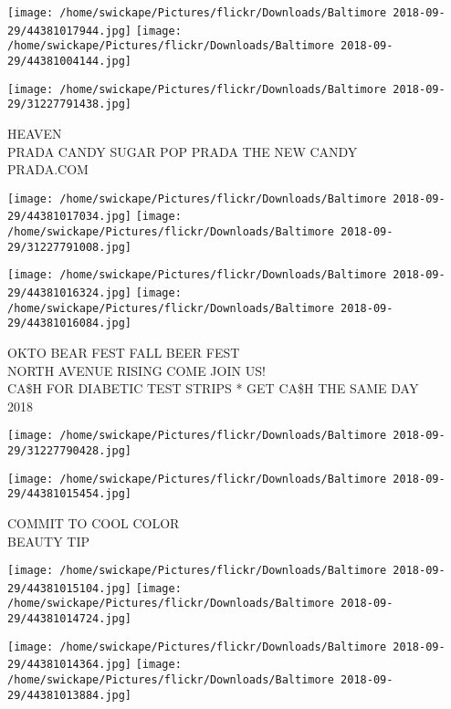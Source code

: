 \documentclass[10pt,letterpaper]{article}
\begin{document}
\texttt{[image: /home/swickape/Pictures/flickr/Downloads/Baltimore 2018-09-29/44381017944.jpg]}
\texttt{[image: /home/swickape/Pictures/flickr/Downloads/Baltimore 2018-09-29/44381004144.jpg]}

\vspace{0.25in}
\texttt{[image: /home/swickape/Pictures/flickr/Downloads/Baltimore 2018-09-29/31227791438.jpg]}

HEAVEN\\
PRADA CANDY SUGAR POP PRADA THE NEW CANDY\\
PRADA.COM\\
\pagebreak

\texttt{[image: /home/swickape/Pictures/flickr/Downloads/Baltimore 2018-09-29/44381017034.jpg]}
\texttt{[image: /home/swickape/Pictures/flickr/Downloads/Baltimore 2018-09-29/31227791008.jpg]}

\texttt{[image: /home/swickape/Pictures/flickr/Downloads/Baltimore 2018-09-29/44381016324.jpg]}
\texttt{[image: /home/swickape/Pictures/flickr/Downloads/Baltimore 2018-09-29/44381016084.jpg]}

OKTO BEAR FEST FALL BEER FEST\\
NORTH AVENUE RISING COME JOIN US!\\
CA\$H FOR DIABETIC TEST STRIPS * GET CA\$H THE SAME DAY\\
2018\\
\pagebreak

\texttt{[image: /home/swickape/Pictures/flickr/Downloads/Baltimore 2018-09-29/31227790428.jpg]}

\vspace{0.25in}
\texttt{[image: /home/swickape/Pictures/flickr/Downloads/Baltimore 2018-09-29/44381015454.jpg]}

COMMIT TO COOL COLOR\\
BEAUTY TIP\\
\pagebreak

\texttt{[image: /home/swickape/Pictures/flickr/Downloads/Baltimore 2018-09-29/44381015104.jpg]}
\texttt{[image: /home/swickape/Pictures/flickr/Downloads/Baltimore 2018-09-29/44381014724.jpg]}

\texttt{[image: /home/swickape/Pictures/flickr/Downloads/Baltimore 2018-09-29/44381014364.jpg]}
\texttt{[image: /home/swickape/Pictures/flickr/Downloads/Baltimore 2018-09-29/44381013884.jpg]}
\end{document}
